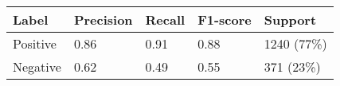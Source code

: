 \begin{tabular}{lllll}
\midrule
\textbf{Label}      & \textbf{Precision} & \textbf{Recall}  & \textbf{F1-score}    & \textbf{Support}    \\
\midrule
Positive            & 0.86               & 0.91             & 0.88                  & 1240 (77\%)         \\
Negative            & 0.62               & 0.49             & 0.55                  & 371 (23\%)          \\
\midrule
\end{tabular}


